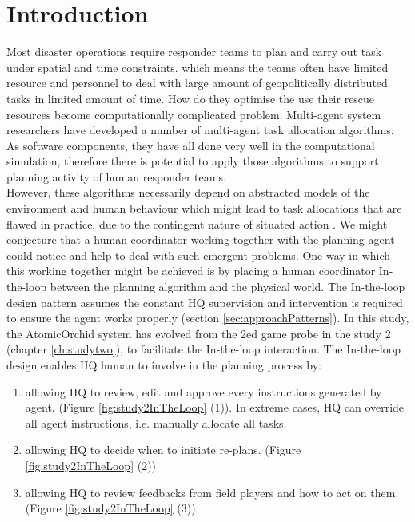 \section{Introduction}
Most disaster operations require responder teams to plan and carry out task under spatial and time constraints. which means the teams often have limited resource and personnel to deal with large amount of geopolitically distributed tasks in limited amount of time. How do they optimise the use their rescue resources become computationally complicated problem. Multi-agent system researchers have developed a number of multi-agent task allocation algorithms. As software components, they have all done very well in the computational simulation, therefore there is potential to apply those algorithms to support planning activity of human responder teams. \\

However, these algorithms necessarily depend on abstracted models of the environment and human behaviour which might lead to task allocations that are flawed in practice, due to the contingent nature of situated action \cite{Suchman1987}. We might conjecture that a human coordinator working together with the planning agent could notice and help to deal with such emergent problems. One way in which this working together might be achieved is by placing a human coordinator In-the-loop between the planning algorithm and the physical world. The In-the-loop design pattern assumes the constant HQ supervision and intervention is required to ensure the agent works properly (section \ref{sec:approachPatterns}). In this study, the AtomicOrchid system has evolved from the 2ed game probe in the study 2 (chapter \ref{ch:studytwo}), to facilitate the In-the-loop interaction. The In-the-loop design enables HQ human to involve in the planning process by: \\



\begin{enumerate}
	\item allowing HQ to review, edit and approve every instructions generated by agent. (Figure \ref{fig:study2InTheLoop} (1)). In extreme cases, HQ can override all agent instructions, i.e. manually allocate all tasks.
	\item allowing HQ to decide when to initiate re-plans. (Figure \ref{fig:study2InTheLoop} (2))
	\item allowing HQ to review feedbacks from field players and how to act on them. (Figure \ref{fig:study2InTheLoop} (3))
\end{enumerate}

